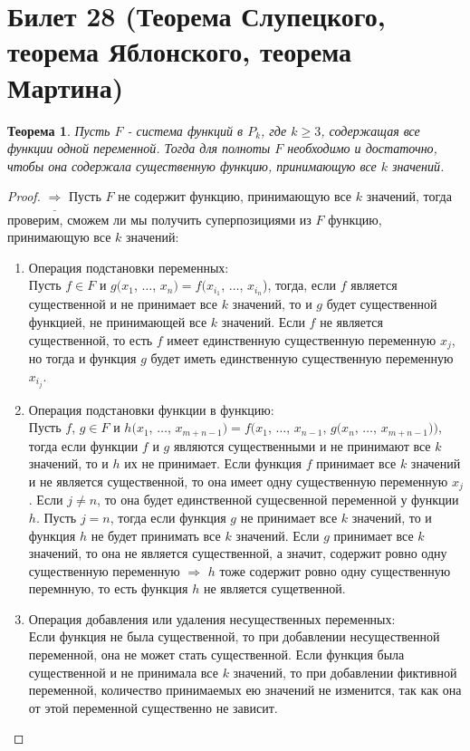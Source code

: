 \documentclass[a4paper, 12pt]{article}
\theoremstyle{definition}
\theoremstyle{plain}
\newtheorem*{theorem}{Теорема}
\theoremstyle{remark}
\begin{document}
  \section{Билет 28 (Теорема Слупецкого, теорема Яблонского, теорема Мартина)}
  \begin{theorem}
    Пусть $F$ - система функций в $P_k$, где $k\geqslant3$, содержащая все функции одной переменной. Тогда для полноты $F$ необходимо и достаточно, чтобы она содержала существенную функцию, принимающую все $k$ значений.
  \end{theorem}
  \begin{proof}
    $\underline{\Longrightarrow}$ Пусть $F$ не содержит функцию, принимающую все $k$ значений, тогда проверим, сможем ли мы получить суперпозициями из $F$ функцию, принимающую все $k$ значений:\\
    \begin{enumerate}
      \item Операция подстановки переменных:\\
      Пусть $f\in F$ и $g(x_1$, $\ldots$, $x_n)=f(x_{i_1}$, $\ldots$, $x_{i_n}$), тогда, если $f$ является существенной и не принимает все $k$ значений, то и $g$ будет существенной функцией, не принимающей все $k$ значений. Если $f$ не является существенной, то есть $f$ имеет единственную существенную переменную $x_j$, но тогда и функция $g$ будет иметь единственную существенную переменную $x_{i_j}$.
      \item Операция подстановки функции в функцию:\\
      Пусть $f$, $g\in F$ и $h(x_1$, $\ldots$, $x_{m+n-1})=f(x_1$, $\ldots$, $x_{n-1}$, $g(x_n$, $\ldots$, $x_{m+n-1}))$, тогда если функции $f$ и $g$ являются существенными и не принимают все $k$ значений, то и $h$ их не принимает. Если функция $f$ принимает все $k$ значений и не является существенной, то она имеет одну существенную переменную $x_j$. Если $j\neq n$, то она будет единственной сущесвенной переменной у функции $h$. Пусть $j=n$, тогда если функция $g$ не принимает все $k$ значений, то и функция $h$ не будет принимать все $k$ значений. Если $g$ принимает все $k$ значений, то она не является существенной, а значит, содержит ровно одну существенную переменную $\Longrightarrow$ $h$ тоже содержит ровно одну существенную перемнную, то есть функция $h$ не является сущетвенной.
      \item Операция добавления или удаления несущественных переменных:\\
      Если функция не была существенной, то при добавлении несущественной переменной, она не может стать существенной. Если функция была существенной и не принимала все $k$ значений, то при добавлении фиктивной переменной, количество принимаемых ею значений не изменится, так как она от этой переменной существенно не зависит.

\end{enumerate}
\end{proof}
\end{document}
